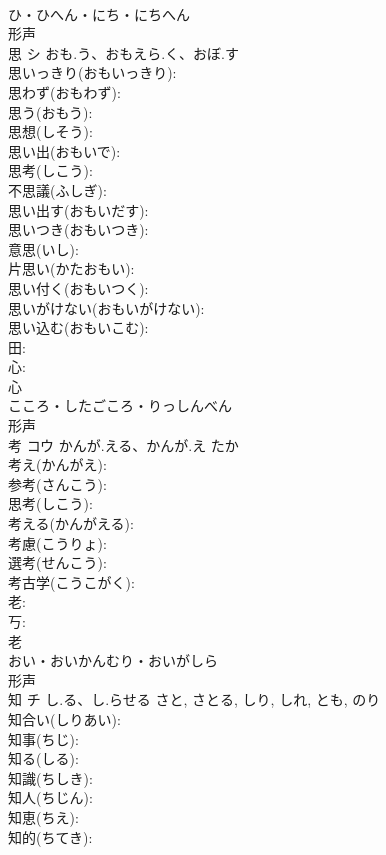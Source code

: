 \documentclass[8pt]{extreport}
\begin{document}
\begin{CJK}{UTF8}{min}
\\	ひ・ひへん・にち・にちへん	
\\	形声 
\\	思	シ	おも.う、おもえら.く、おぼ.す		
\\	思いっきり(おもいっきり): 
\\	思わず(おもわず): 
\\	思う(おもう): 
\\	思想(しそう): 
\\	思い出(おもいで): 
\\	思考(しこう): 
\\	不思議(ふしぎ): 
\\	思い出す(おもいだす): 
\\	思いつき(おもいつき): 
\\	意思(いし): 
\\	片思い(かたおもい): 
\\	思い付く(おもいつく): 
\\	思いがけない(おもいがけない): 
\\	思い込む(おもいこむ): 
\\	田: 
\\	心: 
\\	心	
\\	こころ・したごころ・りっしんべん	
\\	形声 
\\	考	コウ	かんが.える、かんが.え	たか	
\\	考え(かんがえ): 
\\	参考(さんこう): 
\\	思考(しこう): 
\\	考える(かんがえる): 
\\	考慮(こうりょ): 
\\	選考(せんこう): 
\\	考古学(こうこがく): 
\\	老: 
\\	丂: 
\\	老	
\\	おい・おいかんむり・おいがしら	
\\	形声 
\\	知	チ	し.る、し.らせる	さと, さとる, しり, しれ, とも, のり	
\\	知合い(しりあい): 
\\	知事(ちじ): 
\\	知る(しる): 
\\	知識(ちしき): 
\\	知人(ちじん): 
\\	知恵(ちえ): 
\\	知的(ちてき): 

\end{CJK}
\end{document}
